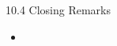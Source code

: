 \begin{frame}{10.4 Closing Remarks}
    \begin{itemize}
        \item
    \end{itemize}
\end{frame}
